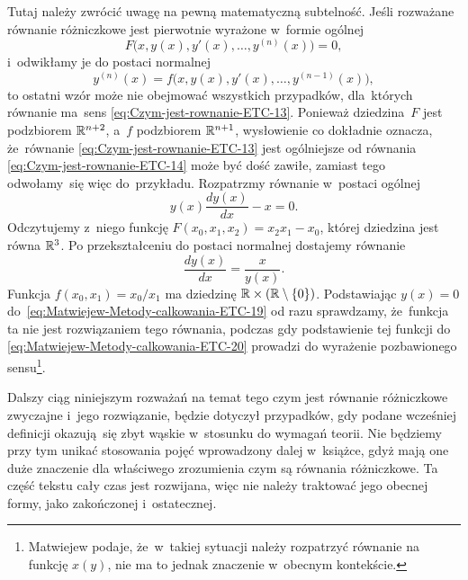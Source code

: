 \documentclass[a4paper,11pt]{article}
\numberwithin{equation}{section}
\begin{document}
Tutaj należy zwrócić uwagę na pewną matematyczną subtelność. Jeśli
rozważane równanie różniczkowe jest pierwotnie wyrażone w~formie ogólnej
\begin{equation}
  \label{eq:Czym-jest-rownanie-ETC-13}
  F\big( x, y( x ), y'( x ), \ldots, y^{ ( n ) }( x ) \big) = 0,
\end{equation}
i~odwikłamy je do postaci normalnej
\begin{equation}
  \label{eq:Czym-jest-rownanie-ETC-14}
  y^{ ( n ) }( x ) = f\big( x, y( x ), y'( x ), \ldots, y^{ ( n - 1 ) }( x ) \big),
\end{equation}
to ostatni wzór może nie obejmować wszystkich przypadków, dla~których
równanie ma~sens \eqref{eq:Czym-jest-rownanie-ETC-13}. Ponieważ
dziedzina~$F$ jest podzbiorem $\mathbb{R}^{ n + 2 }$, a~$f$ podzbiorem
$\mathbb{R}^{ n + 1 }$, wysłowienie co dokładnie oznacza, że~równanie
\eqref{eq:Czym-jest-rownanie-ETC-13}
jest ogólniejsze od równania \eqref{eq:Czym-jest-rownanie-ETC-14}
może być dość zawiłe, zamiast tego odwołamy~się więc do~przykładu.
Rozpatrzmy równanie w~postaci ogólnej
\begin{equation}
  \label{eq:Czym-jest-rownanie-ETC-15}
  y( x ) \frac{ d y( x ) }{ dx } - x = 0.
\end{equation}
Odczytujemy z~niego funkcję
$F( x_{ 0 }, x_{ 1 }, x_{ 2 } ) = x_{ 2 } x_{ 1 } - x_{ 0 }$, której dziedzina
jest równa $\mathbb{R}^{ 3 }$. Po przekształceniu do postaci normalnej dostajemy
równanie
\begin{equation}
  \label{eq:Czym-jest-rownanie-ETC-16}
  \frac{ d y( x ) }{ d x } = \frac{ x }{ y( x ) }.
\end{equation}
Funkcja $f( x_{ 0 }, x_{ 1 } ) = x_{ 0 } / x_{ 1 }$ ma dziedzinę
$\mathbb{R} \times ( \mathbb{R} \setminus \{ 0 \} )$. Podstawiając $y( x ) = 0$
do~\eqref{eq:Matwiejew-Metody-calkowania-ETC-19} od razu sprawdzamy,
że~funkcja ta nie jest rozwiązaniem tego równania, podczas gdy podstawienie
tej funkcji do \eqref{eq:Matwiejew-Metody-calkowania-ETC-20} prowadzi do
wyrażenie pozbawionego sensu\footnote{Matwiejew podaje, że~w~takiej
  sytuacji należy rozpatrzyć równanie na funkcję $x( y )$, nie ma to
  jednak znaczenie w~obecnym kontekście.}.

Dalszy ciąg niniejszym rozważań na temat tego czym jest równanie
różniczkowe zwyczajne i~jego rozwiązanie, będzie dotyczył przypadków, gdy
podane wcześniej definicji okazują~się zbyt wąskie w~stosunku do wymagań
teorii. Nie będziemy przy tym unikać stosowania pojęć wprowadzony dalej
w~książce, gdyż mają one duże znaczenie dla właściwego zrozumienia czym są
równania różniczkowe. Ta część tekstu cały czas jest rozwijana, więc nie
należy traktować jego obecnej formy, jako zakończonej i~ostatecznej.
\end{document}
